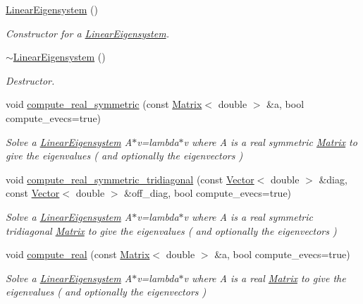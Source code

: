 \begin{DoxyCompactItemize}
\item 
\hyperlink{classLuna_1_1LinearEigensystem_a6a285716463cb439b2c82d0055d247c5}{Linear\+Eigensystem} ()
\begin{DoxyCompactList}\small\item\em Constructor for a \hyperlink{classLuna_1_1LinearEigensystem}{Linear\+Eigensystem}. \end{DoxyCompactList}\item 
\hyperlink{classLuna_1_1LinearEigensystem_a3bb8fffcca088facf2e8efedc20d9944}{$\sim$\+Linear\+Eigensystem} ()
\begin{DoxyCompactList}\small\item\em Destructor. \end{DoxyCompactList}\item 
void \hyperlink{classLuna_1_1LinearEigensystem_ae109e1012fda347ac9c1da4fa30313f6}{compute\+\_\+real\+\_\+symmetric} (const \hyperlink{classLuna_1_1Matrix}{Matrix}$<$ double $>$ \&a, bool compute\+\_\+evecs=true)
\begin{DoxyCompactList}\small\item\em Solve a \hyperlink{classLuna_1_1LinearEigensystem}{Linear\+Eigensystem} A$\ast$v=lambda$\ast$v where A is a real symmetric \hyperlink{classLuna_1_1Matrix}{Matrix} to give the eigenvalues ( and optionally the eigenvectors ) \end{DoxyCompactList}\item 
void \hyperlink{classLuna_1_1LinearEigensystem_a91ac311c3fe4226c4652b6bf41fc0d91}{compute\+\_\+real\+\_\+symmetric\+\_\+tridiagonal} (const \hyperlink{classLuna_1_1Vector}{Vector}$<$ double $>$ \&diag, const \hyperlink{classLuna_1_1Vector}{Vector}$<$ double $>$ \&off\+\_\+diag, bool compute\+\_\+evecs=true)
\begin{DoxyCompactList}\small\item\em Solve a \hyperlink{classLuna_1_1LinearEigensystem}{Linear\+Eigensystem} A$\ast$v=lambda$\ast$v where A is a real symmetric tridiagonal \hyperlink{classLuna_1_1Matrix}{Matrix} to give the eigenvalues ( and optionally the eigenvectors ) \end{DoxyCompactList}\item 
void \hyperlink{classLuna_1_1LinearEigensystem_ab303a80cc2cf6bfe232b9d62efe13109}{compute\+\_\+real} (const \hyperlink{classLuna_1_1Matrix}{Matrix}$<$ double $>$ \&a, bool compute\+\_\+evecs=true)
\begin{DoxyCompactList}\small\item\em Solve a \hyperlink{classLuna_1_1LinearEigensystem}{Linear\+Eigensystem} A$\ast$v=lambda$\ast$v where A is a real \hyperlink{classLuna_1_1Matrix}{Matrix} to give the eigenvalues ( and optionally the eigenvectors ) \end{DoxyCompactList}\item 

\end{DoxyCompactItemize}
